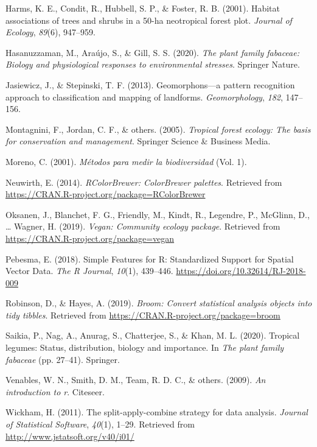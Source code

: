\documentclass[11pt,]{article}
\begin{document}
\hypertarget{ref-harms2001habitat}{}
Harms, K. E., Condit, R., Hubbell, S. P., \& Foster, R. B. (2001).
Habitat associations of trees and shrubs in a 50-ha neotropical forest
plot. \emph{Journal of Ecology}, \emph{89}(6), 947--959.

\hypertarget{ref-hasanuzzaman2020plant}{}
Hasanuzzaman, M., Araújo, S., \& Gill, S. S. (2020). \emph{The plant
family fabaceae: Biology and physiological responses to environmental
stresses}. Springer Nature.

\hypertarget{ref-jasiewicz2013geomorphons}{}
Jasiewicz, J., \& Stepinski, T. F. (2013). Geomorphons---a pattern
recognition approach to classification and mapping of landforms.
\emph{Geomorphology}, \emph{182}, 147--156.

\hypertarget{ref-montagnini2005tropical}{}
Montagnini, F., Jordan, C. F., \& others. (2005). \emph{Tropical forest
ecology: The basis for conservation and management}. Springer Science \&
Business Media.

\hypertarget{ref-book}{}
Moreno, C. (2001). \emph{Métodos para medir la biodiversidad} (Vol. 1).

\hypertarget{ref-RcolorBrewer}{}
Neuwirth, E. (2014). \emph{RColorBrewer: ColorBrewer palettes}.
Retrieved from \url{https://CRAN.R-project.org/package=RColorBrewer}

\hypertarget{ref-vegan}{}
Oksanen, J., Blanchet, F. G., Friendly, M., Kindt, R., Legendre, P.,
McGlinn, D., \ldots{} Wagner, H. (2019). \emph{Vegan: Community ecology
package}. Retrieved from \url{https://CRAN.R-project.org/package=vegan}

\hypertarget{ref-sf}{}
Pebesma, E. (2018). Simple Features for R: Standardized Support for
Spatial Vector Data. \emph{The R Journal}, \emph{10}(1), 439--446.
\url{https://doi.org/10.32614/RJ-2018-009}

\hypertarget{ref-broom}{}
Robinson, D., \& Hayes, A. (2019). \emph{Broom: Convert statistical
analysis objects into tidy tibbles}. Retrieved from
\url{https://CRAN.R-project.org/package=broom}

\hypertarget{ref-saikia2020tropical}{}
Saikia, P., Nag, A., Anurag, S., Chatterjee, S., \& Khan, M. L. (2020).
Tropical legumes: Status, distribution, biology and importance. In
\emph{The plant family fabaceae} (pp. 27--41). Springer.

\hypertarget{ref-venables2009introduction}{}
Venables, W. N., Smith, D. M., Team, R. D. C., \& others. (2009).
\emph{An introduction to r}. Citeseer.

\hypertarget{ref-plyr}{}
Wickham, H. (2011). The split-apply-combine strategy for data analysis.
\emph{Journal of Statistical Software}, \emph{40}(1), 1--29. Retrieved
from \url{http://www.jstatsoft.org/v40/i01/}




\newpage
\singlespacing 
\end{document}
